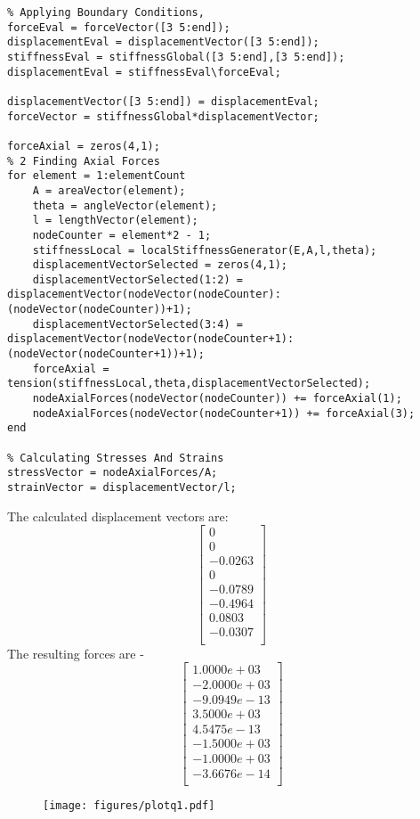 \documentclass{article}
\begin{document}
\begin{verbatim}
% Applying Boundary Conditions,
forceEval = forceVector([3 5:end]);
displacementEval = displacementVector([3 5:end]);
stiffnessEval = stiffnessGlobal([3 5:end],[3 5:end]);
displacementEval = stiffnessEval\forceEval;

displacementVector([3 5:end]) = displacementEval;
forceVector = stiffnessGlobal*displacementVector;

forceAxial = zeros(4,1);
% 2 Finding Axial Forces
for element = 1:elementCount
    A = areaVector(element);
    theta = angleVector(element);
    l = lengthVector(element);
    nodeCounter = element*2 - 1;
    stiffnessLocal = localStiffnessGenerator(E,A,l,theta);
    displacementVectorSelected = zeros(4,1);
    displacementVectorSelected(1:2) = displacementVector(nodeVector(nodeCounter):(nodeVector(nodeCounter))+1);
    displacementVectorSelected(3:4) = displacementVector(nodeVector(nodeCounter+1):(nodeVector(nodeCounter+1))+1);
    forceAxial = tension(stiffnessLocal,theta,displacementVectorSelected);
    nodeAxialForces(nodeVector(nodeCounter)) += forceAxial(1);
    nodeAxialForces(nodeVector(nodeCounter+1)) += forceAxial(3);
end

% Calculating Stresses And Strains
stressVector = nodeAxialForces/A;
strainVector = displacementVector/l;
\end{verbatim}

The calculated displacement vectors are:
\[
\begin{bmatrix}
0 \\
    0 \\
-0.0263 \\
    0 \\
-0.0789 \\
-0.4964 \\
0.0803 \\
-0.0307   \\
\end{bmatrix}
\]
The resulting forces are - 
\[
    \begin{bmatrix}
  1.0000e+03 \\
  -2.0000e+03 \\
  -9.0949e-13 \\
   3.5000e+03 \\
   4.5475e-13 \\
  -1.5000e+03 \\
  -1.0000e+03 \\
  -3.6676e-14    \\
    \end{bmatrix}
\]
\begin{figure}[h]
        \texttt{[image: figures/plotq1.pdf]}
\end{figure}
\end{document}

